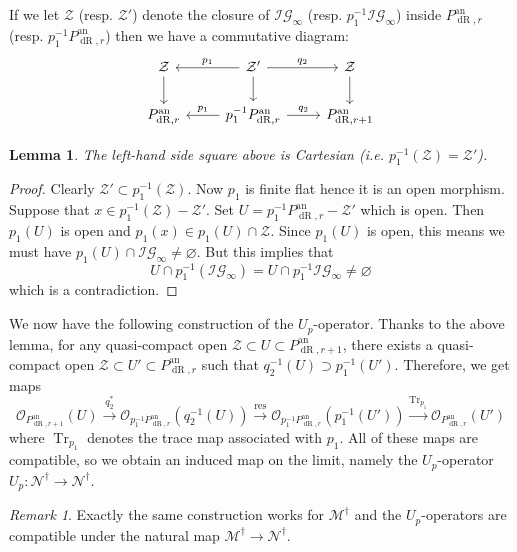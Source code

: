 \documentclass[10pt, oneside]{amsart}
\numberwithin{equation}{subsection}
\newtheorem{lemma}[equation]{Lemma}
\theoremstyle{definition}
\theoremstyle{remark}
\newtheorem{remark}[equation]{Remark}
\newcommand{\opn}[1]{\operatorname{#1}}
\begin{document}
If we let $\mathcal{Z}$ (resp. $\mathcal{Z}'$) denote the closure of $\mathcal{IG}_{\infty}$ (resp. $p_1^{-1}\mathcal{IG}_{\infty}$) inside $P_{\opn{dR}, r}^{\opn{an}}$ (resp. $p_1^{-1}P_{\opn{dR}, r}^{\opn{an}}$) then we have a commutative diagram:
\[
\begin{tikzcd}
\mathcal{Z} \arrow[d]              & \mathcal{Z}' \arrow[l, "p_1"'] \arrow[r, "q_2"] \arrow[d]                 & \mathcal{Z} \arrow[d]              \\
P_{\opn{dR}, r}^{\opn{an}} & p_1^{-1}P_{\opn{dR}, r}^{\opn{an}} \arrow[l, "p_1"'] \arrow[r, "q_2"] & P_{\opn{dR}, r+1}^{\opn{an}}
\end{tikzcd}
\]

\begin{lemma}
The left-hand side square above is Cartesian (i.e. $p_1^{-1}(\mathcal{Z}) = \mathcal{Z}'$).
\end{lemma}
\begin{proof}
Clearly $\mathcal{Z}' \subset p_1^{-1}(\mathcal{Z})$. Now $p_1$ is finite flat hence it is an open morphism. Suppose that $x \in p_1^{-1}(\mathcal{Z}) - \mathcal{Z}'$. Set $U = p_1^{-1}P_{\opn{dR}, r}^{\opn{an}} - \mathcal{Z}'$ which is open. Then $p_1(U)$ is open and $p_1(x) \in p_1(U) \cap \mathcal{Z}$. Since $p_1(U)$ is open, this means we must have $p_1(U) \cap \mathcal{IG}_{\infty} \neq \varnothing$. But this implies that
\[
U \cap p_1^{-1}(\mathcal{IG}_{\infty}) = U \cap p_1^{-1}\mathcal{IG}_{\infty} \neq \varnothing 
\]
which is a contradiction.
\end{proof}

We now have the following construction of the $U_p$-operator. Thanks to the above lemma, for any quasi-compact open $\mathcal{Z} \subset U \subset P_{\opn{dR}, r+1}^{\opn{an}}$, there exists a quasi-compact open $\mathcal{Z} \subset U' \subset P_{\opn{dR}, r}^{\opn{an}}$ such that $q_2^{-1}(U) \supset p_1^{-1}(U')$. Therefore, we get maps
\[
\mathcal{O}_{P_{\opn{dR}, r+1}^{\opn{an}}}(U) \xrightarrow{q_2^*} \mathcal{O}_{p_1^{-1}P_{\opn{dR}, r}^{\opn{an}}}(q_2^{-1}(U)) \xrightarrow{\opn{res}} \mathcal{O}_{p_1^{-1}P_{\opn{dR}, r}^{\opn{an}}}(p_1^{-1}(U')) \xrightarrow{\opn{Tr}_{p_1}} \mathcal{O}_{P_{\opn{dR}, r}^{\opn{an}}}(U') 
\]
where $\opn{Tr}_{p_1}$ denotes the trace map associated with $p_1$. All of these maps are compatible, so we obtain an induced map on the limit, namely the $U_p$-operator $U_p \colon \mathscr{N}^{\dagger} \to \mathscr{N}^{\dagger}$.

\begin{remark}
Exactly the same construction works for $\mathscr{M}^{\dagger}$ and the $U_p$-operators are compatible under the natural map $\mathscr{M}^{\dagger} \to \mathscr{N}^{\dagger}$.
\end{remark}
\end{document}
